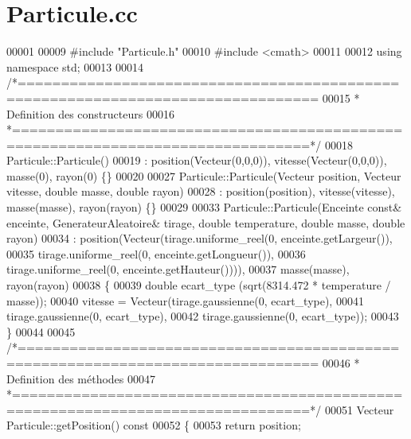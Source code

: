 \section{Particule.\+cc}
\label{_particule_8cc_source}

\begin{DoxyCode}
00001 
00009 \textcolor{preprocessor}{#include "Particule.h"}
00010 \textcolor{preprocessor}{#include <cmath>}
00011 
00012 \textcolor{keyword}{using namespace }std;
00013 
00014 \textcolor{comment}{/*================================================================================}
00015 \textcolor{comment}{ * Definition des constructeurs}
00016 \textcolor{comment}{ *================================================================================*/}
00018 Particule::Particule()
00019     : position(Vecteur(0,0,0)), vitesse(Vecteur(0,0,0)), masse(0), rayon(0) \{\}
00020 
00027 Particule::Particule(Vecteur position, Vecteur vitesse, \textcolor{keywordtype}{double} masse, \textcolor{keywordtype}{double} rayon)
00028     : position(position), vitesse(vitesse), masse(masse), rayon(rayon) \{\}
00029 
00033 Particule::Particule(Enceinte \textcolor{keyword}{const}& enceinte, GenerateurAleatoire& tirage, \textcolor{keywordtype}{double} temperature, \textcolor{keywordtype}{double} 
      masse, \textcolor{keywordtype}{double} rayon)
00034     : position(Vecteur(tirage.uniforme\_reel(0, enceinte.getLargeur()),
00035                        tirage.uniforme\_reel(0, enceinte.getLongueur()),
00036                        tirage.uniforme\_reel(0, enceinte.getHauteur()))), 
00037       masse(masse), rayon(rayon)
00038 \{
00039     \textcolor{keywordtype}{double} ecart\_type (sqrt(8314.472 * temperature / masse));
00040     vitesse = Vecteur(tirage.gaussienne(0, ecart\_type),
00041                       tirage.gaussienne(0, ecart\_type),
00042                       tirage.gaussienne(0, ecart\_type));
00043 \}                     
00044 
00045 \textcolor{comment}{/*================================================================================}
00046 \textcolor{comment}{ * Definition des méthodes}
00047 \textcolor{comment}{ *================================================================================*/}
00051 Vecteur Particule::getPosition()\textcolor{keyword}{ const}
00052 \textcolor{keyword}{}\{
00053     \textcolor{keywordflow}{return} position;

\end{DoxyCode}
